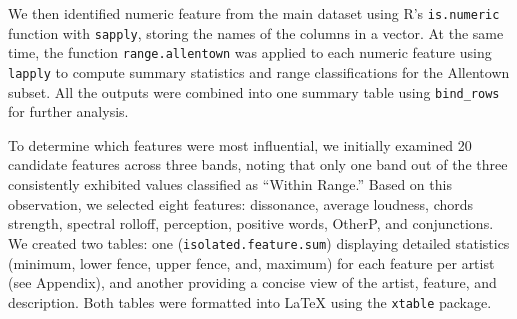 \documentclass{article}\usepackage[]{graphicx}\usepackage[]{xcolor}
\begin{document}
\begin{multicols}{2}
We then identified numeric feature from the main dataset using R’s \texttt{is.numeric} function with \texttt{sapply}, storing the names of the columns in a vector. At the same time, the function \texttt{range.allentown} was applied to each numeric feature using \texttt{lapply} to compute summary statistics and range classifications for the Allentown subset. All the outputs were combined into one summary table using \texttt{bind\_rows} for further analysis.

To determine which features were most influential, we initially examined 20 candidate features across three bands, noting that only one band out of the three consistently exhibited values classified as “Within Range.” Based on this observation, we selected eight features: dissonance, average loudness, chords strength, spectral rolloff, perception, positive words, OtherP, and conjunctions. We created two tables: one (\texttt{isolated.feature.sum}) displaying detailed statistics (minimum, lower fence, upper fence, and, maximum) for each feature per artist (see Appendix), and another providing a concise view of the artist, feature, and description. Both tables were formatted into LaTeX using the \texttt{xtable} package\citep{Xtable}.


\end{multicols}
\end{document}
